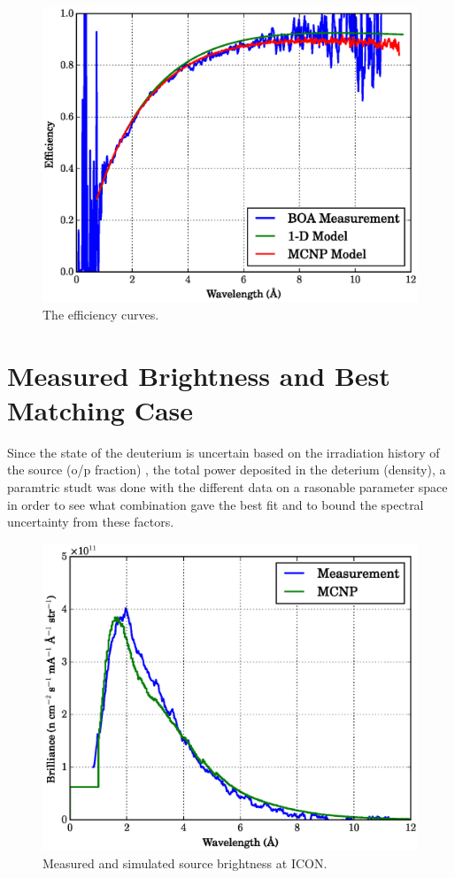 \documentclass[preprint,12pt]{elsarticle}
\begin{document}
\begin{figure}[h!] 
  \centering
    \includegraphics[width=\columnwidth]{graphics/eff.eps}
     \caption{The efficiency curves. \label{fig:eff} }
\end{figure}

%
%
%
%
%

\section{Measured Brightness and Best Matching Case}
\label{sec:results}

Since the state of the deuterium is uncertain based on the irradiation history of the source (o/p fraction) \cite{op_equi}, the total power deposited in the deterium (density), a paramtric studt was done with the different data on a rasonable parameter space in order to see what combination gave the best fit and to bound the spectral uncertainty from these factors.

\begin{figure}[h!] 
  \centering
    \includegraphics[width=\columnwidth]{graphics/brightness.eps}
     \caption{Measured and simulated source brightness at ICON. \label{fig:brightness} }
\end{figure}
\end{document}
